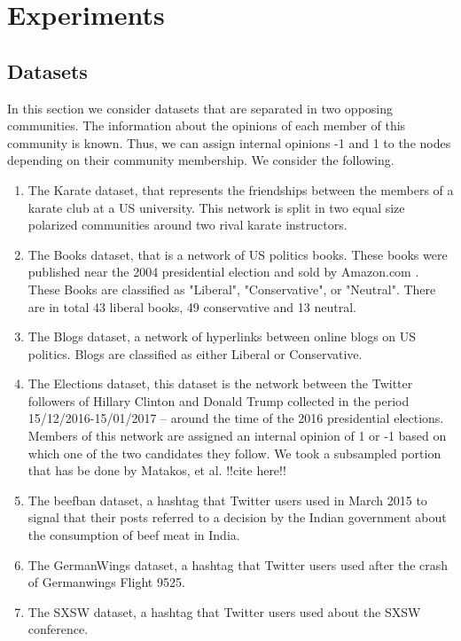 \chapter{Experiments}
\label{ch:experiments}

\section{Datasets}
\label{sec:ds}

In this section we consider datasets that are separated in two opposing communities. The information about the opinions of each member of this community is known. Thus, we can assign internal opinions -1 and 1 to the nodes depending on their community membership\cite{tsapMatakosTerzi}.  We consider the following.

\begin{enumerate}

  \item The Karate dataset, that represents the friendships between the members of a karate club at a US university. This network is split in two equal size polarized communities around two rival karate instructors.
  
  \item The Books dataset, that is a network of US politics books. These books were published near the 2004 presidential election and sold by Amazon.com . These Books are classified as "Liberal", "Conservative", or "Neutral".  There are in total 43 liberal books, 49 conservative and 13 neutral.
  
  \item The Blogs dataset, a network of hyperlinks between online blogs on US politics. Blogs are classified as either Liberal or Conservative.
  
  \item The Elections dataset, this dataset is the network between the Twitter followers of Hillary Clinton and Donald Trump collected in the period 15/12/2016-15/01/2017 – around the time of the 2016 presidential elections. Members of this network are assigned an internal opinion of 1 or -1 based on which one of the two candidates they follow. We took a subsampled portion that has be done by Matakos, et al. !!cite here!!
  
  \item The beefban dataset, a  hashtag that Twitter users used in March 2015 to signal that their posts referred to a decision by the Indian government about the consumption of beef meat in India.
  
  \item The GermanWings dataset, a  hashtag that Twitter users used after the crash of Germanwings Flight 9525.
  
  \item The SXSW dataset, a hashtag that Twitter users used about the SXSW conference.

\end{enumerate}


